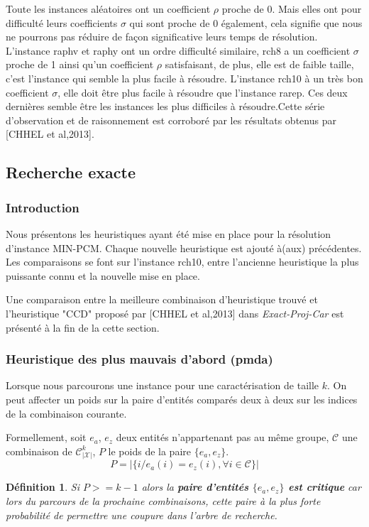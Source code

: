 \documentclass[a4paper,10pt]{article}
\newtheorem{definition}{Définition}
\begin{document}
Toute les instances aléatoires ont un coefficient $\rho$ proche de 0. Mais elles ont pour difficulté leurs coefficients $\sigma$ qui sont proche de 0 également, cela signifie que nous ne pourrons pas réduire de façon significative leurs temps de résolution. L'instance raphv et raphy ont un ordre difficulté similaire, rch8 a un coefficient $\sigma$ proche de 1 ainsi qu'un coefficient $\rho$ satisfaisant, de plus, elle est de faible taille, c'est l'instance qui semble la plus facile à résoudre. L'instance rch10 à un très bon coefficient $\sigma$, elle doit être plus facile à résoudre que l'instance rarep. Ces deux dernières semble être les instances les plus difficiles à résoudre.Cette série d'observation et de raisonnement est corroboré par les résultats obtenus par [CHHEL et al,2013].

\subsection{Recherche exacte}
\subsubsection{Introduction}
Nous présentons les heuristiques ayant été mise en place pour la résolution d'instance MIN-PCM. Chaque nouvelle heuristique est ajouté à(aux) précédentes. Les comparaisons se font sur l'instance rch10, entre l'ancienne heuristique la plus puissante connu et la nouvelle mise en place. 

Une comparaison entre la meilleure combinaison d'heuristique trouvé et l'heuristique "CCD" proposé par [CHHEL et al,2013] dans \textit{Exact-Proj-Car} est présenté à la fin de la cette section.
\subsubsection{Heuristique des plus mauvais d'abord (pmda)}
Lorsque nous parcourons une instance pour une caractérisation de taille $k$. On peut affecter un poids sur la paire d'entités comparés deux à deux sur les indices de la combinaison courante.

Formellement, soit $e_a$, $e_z$ deux entités n'appartenant pas au même groupe, $\mathcal{C}$ une combinaison de $\mathcal{C}_{|\mathcal{X}|}^k$, $P$ le poids de la paire $\{e_a,e_z\}$.
$$ P = |\{i / e_a(i)=e_z(i), \forall i \in \mathcal{C}\}| $$

\begin{definition}
Si $P>=k-1$ alors la \textbf{paire d'entités $\{e_a,e_z\}$ est critique} car lors du parcours de la prochaine combinaisons, cette paire à la plus forte probabilité de permettre une coupure dans l'arbre de recherche.
\end{definition}
\end{document}
